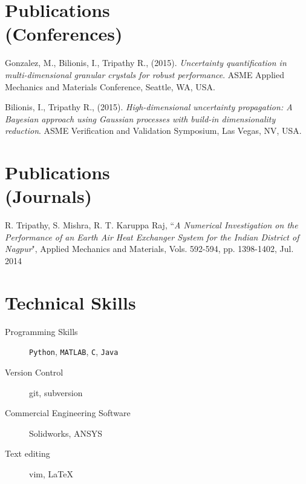 \documentclass[margin,line,a4paper]{resume}
\begin{document}
\begin{resume}
\section{\mysidestyle Publications \\ (Conferences)}
\begin{description}
\item Gonzalez, M., Bilionis, I., Tripathy R., (2015). \textit{Uncertainty quantification in multi-dimensional granular crystals for robust performance}. ASME Applied Mechanics and Materials Conference, Seattle, WA, USA.
\item Bilionis, I., Tripathy R., (2015). \textit{High-dimensional uncertainty propagation: A Bayesian approach using Gaussian processes with build-in dimensionality reduction}. ASME Verification and Validation Symposium, Las Vegas, NV, USA.
\end{description}



\section{\mysidestyle Publications \\ (Journals)}
\begin{description}
\item R. Tripathy, S. Mishra, R. T. Karuppa Raj, ``\textit{A Numerical Investigation on the Performance of an Earth Air Heat Exchanger System for the Indian District of Nagpur}", Applied Mechanics and Materials, Vols. 592-594, pp. 1398-1402, Jul. 2014
\end{description}




\section{\mysidestyle Technical Skills}
\begin{description}
\item[Programming Skills] \texttt{Python}, \texttt{MATLAB}, \texttt{C}, \texttt{Java}
\item[Version Control] git, subversion 
\item[Commercial Engineering Software] Solidworks, ANSYS
\item[Text editing] vim, \LaTeX
\end{description}




\end{resume}
\end{document}
